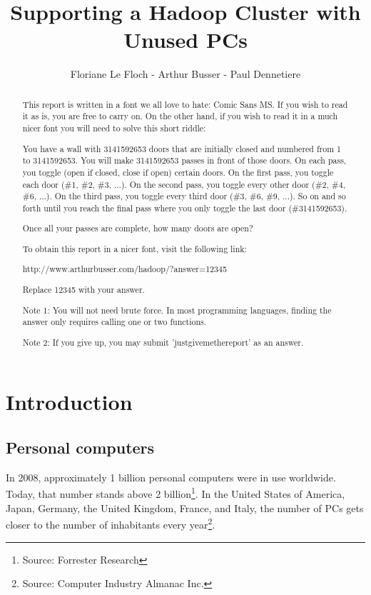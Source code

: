 \documentclass[11pt]{report} %
\title{Supporting a Hadoop Cluster with Unused PCs}
\author{Floriane Le Floch - Arthur Busser - Paul Dennetiere}
\begin{document}
\maketitle
\renewcommand{\contentsname}{Summary}
\newpage
\tableofcontents
\newpage

\renewcommand{\abstractname}{Short riddle}
\begin{abstract}

This report is written in a font we all love to hate: Comic Sans MS. If you wish to read it as is, you are free to carry on. On the other hand, if you wish to read it in a much nicer font you will need to solve this short riddle:

You have a wall with 3141592653 doors that are initially closed and numbered from 1 to 3141592653. You will make 3141592653 passes in front of those doors. On each pass, you toggle (open if closed, close if open) certain doors. On the first pass, you toggle each door (\#1, \#2, \#3, ...). On the second pass, you toggle every other door (\#2, \#4, \#6, ...). On the third pass, you toggle every third door (\#3, \#6, \#9, ...). So on and so forth until you reach the final pass where you only toggle the last door (\#3141592653).

Once all your passes are complete, how many doors are open?

To obtain this report in a nicer font, visit the following link:

http://www.arthurbusser.com/hadoop/?answer=12345

Replace 12345 with your answer.

Note 1: You will not need brute force. In most programming languages, finding the answer only requires calling one or two functions.

Note 2: If you give up, you may submit 'justgivemethereport' as an answer.

\end{abstract}

\chapter{Introduction}

\section{Personal computers}
In 2008, approximately 1 billion personal computers were in use worldwide. Today, that number stands above 2 billion\footnote{Source: Forrester Research}. In the United States of America, Japan, Germany, the United Kingdom, France, and Italy, the number of PCs gets closer to the number of inhabitants every year\footnote{Source: Computer Industry Almanac Inc.}.
\end{document}

